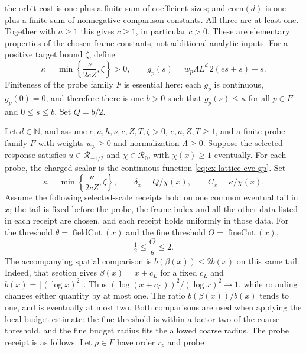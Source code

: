the orbit cost is one plus a finite sum of coefficient sizes; and
$\mathrm{corn}(d)$ is one plus a finite sum of nonnegative comparison
constants. All three are at least one. Together with $a\ge1$ this gives
$c\ge1$, in particular $c>0$. These are elementary properties of the
chosen frame constants, not additional analytic inputs. For a positive target
bound $\zeta$, define
\begin{equation}
 \kappa=\min\left\{\frac{\nu}{2cZ},\zeta\right\}>0,
 \qquad
 g_p(s)=w_p\Lambda L^d\,2(es+s)+s.
 \label{eq:ex-lattice-eve-gp}
\end{equation}
Finiteness of the probe family $F$ is essential here: each $g_p$ is continuous,
$g_p(0)=0$, and therefore there is one $b>0$ such that $g_p(s)\le\kappa$
for all $p\in F$ and $0\le s\le b$. Set $Q=b/2$.

\begin{theorem}
\label{thm:ex-lattice-eve-producer}
Let $d\in\mathbb N$, and assume $e,a,h,\nu,c,Z,T,\zeta>0$, $e,a,Z,T\ge1$,
and a finite probe family $F$ with weights $w_p\ge0$ and normalization
$\Lambda\ge0$. Suppose the selected response satisfies
$u\in\mathcal R_{-1/2}$ and $\chi\in\mathcal R_0$, with $\chi(x)\ge1$
eventually.
For each probe, the charged scalar is the continuous function
\eqref{eq:ex-lattice-eve-gp}. Set
\[
 \kappa=\min\left\{\frac{\nu}{2cZ},\zeta\right\},\qquad
 \delta_x=Q/\chi(x),\qquad C_x=\kappa/\chi(x).
\]
Assume the following selected-scale receipts hold on one common eventual
tail in $x$; the tail is fixed before the probe, the frame index and all
the other data listed in each receipt are chosen, and each receipt holds
uniformly in those data. For the threshold $\theta=\operatorname{fieldCut}(x)$
and the fine threshold $\Theta=\operatorname{fineCut}(x)$,
\begin{equation}
 \tfrac12\le \frac{\Theta}{\theta}\le2.
 \label{eq:ex-lattice-eve-blend}
\end{equation}
The accompanying spatial comparison is
$b(\beta(x))\le2b(x)$ on this same tail. Indeed, that section gives $\beta(x)=x+c_L$ for a fixed $c_L$ and
$b(x)=\lceil(\log x)^2\rceil$. Thus
$(\log(x+c_L))^2/(\log x)^2\to1$, while rounding changes either
quantity by at most one. The ratio $b(\beta(x))/b(x)$ tends to one,
and is eventually at most two.
Both comparisons are used when applying the local budget estimate:
the fine threshold is within a factor two of the coarse threshold,
and the fine budget radius fits the allowed coarse radius.
The probe receipt is as follows. Let $p\in F$ have order $r_p$ and probe

\end{theorem}
